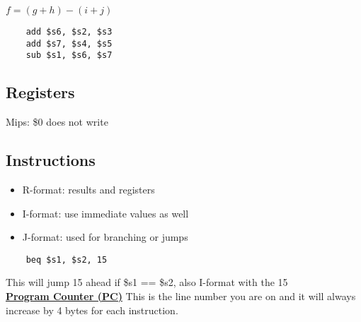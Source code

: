 \documentclass[12pt]{article}
\newcommand{\myt}[1]{\textbf{\underline{#1}}}
\begin{document}
	$f = (g + h) - (i + j)$\\
	\lstset{language=[mips]Assembler}
	\begin{lstlisting}
	add $s6, $s2, $s3
	add $s7, $s4, $s5
	sub $s1, $s6, $s7
	\end{lstlisting}
	
	\subsection*{Registers}
	Mips: \$0 does not write\\
	
	\subsection*{Instructions}
	\begin{itemize}
		\item R-format: results and registers
		\item I-format: use immediate values as well
		\item J-format: used for branching or jumps
	\end{itemize}
	
	\lstset{language=[mips]Assembler}
	\begin{lstlisting}
	beq $s1, $s2, 15
	\end{lstlisting}
	
	This will jump 15 ahead if \$s1 == \$s2, also I-format with the 15\\
	
	\myt{Program Counter (PC)} This is the line number you are on and it will always increase by 4 bytes for each instruction.
	
	
	
	
\end{document}
